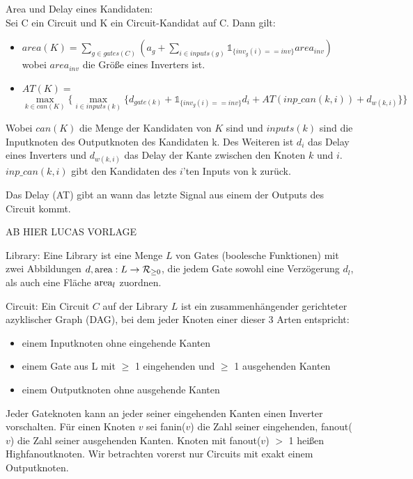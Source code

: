 \documentclass[11pt, a4paper, german]{article}
\begin{document}
\begin{definition}{Area und Delay eines Kandidaten:}\\
Sei C ein Circuit und K ein Circuit-Kandidat auf C. Dann gilt: \\
\begin{itemize}
\item $area(K) = \sum_{g \in gates(C)} (a_g + \sum_{i \in inputs(g)} \mathbb{1}_{\{inv_g(i)==inv\}} area_{inv})$ \\
wobei $area_{inv}$ die Größe eines Inverters ist.
\item $AT(K) = $\\$  \max\limits_{k \in can(K)} \{\max\limits_{i \in inputs(k)} \{   d_{gate(k)} + \mathbb{1}_{\{inv_g(i)==inv\}} d_{i} + AT(inp\_can(k,i)) + d_{w(k,i)} \} \}$ 
\end{itemize}
Wobei $can(K)$ die Menge der Kandidaten von $K$ sind und $inputs(k)$ sind die Inputknoten des Outputknoten des Kandidaten k. Des Weiteren ist $d_i$ das Delay eines Inverters und $d_{w(k,i)} $ das Delay der Kante zwischen den Knoten $k$ und $i$. $inp\_can(k,i)$ gibt den Kandidaten des $i$'ten Inputs von k zurück. 

\end{definition}

Das Delay (AT) gibt an wann das letzte Signal aus einem der Outputs des Circuit kommt.



AB HIER LUCAS VORLAGE

\begin{definition}{Library: }Eine Library ist eine Menge $L$ von Gates (boolesche Funktionen) mit zwei Abbildungen $d, \text{area}: L \to \mathcal{R}_{\geq 0}$, die jedem Gate sowohl eine Verzögerung $d_l$, als auch eine Fl\"ache $\text{area}_l$ zuordnen.
\end{definition}

\begin{figure}
 
\end{figure}


\begin{definition}{Circuit: }Ein Circuit $C$ auf der Library $L$ ist ein zusammenhängender gerichteter azyklischer Graph (DAG), bei dem jeder Knoten einer dieser 3 Arten entspricht:
 \begin{itemize}
  \item einem Inputknoten ohne eingehende Kanten
  \item einem Gate aus L mit $\geq$ 1 eingehenden und $\geq$ 1 ausgehenden Kanten
  \item einem Outputknoten ohne ausgehende Kanten
 \end{itemize}
 Jeder Gateknoten kann an jeder seiner eingehenden Kanten einen Inverter vorschalten.
 Für einen Knoten $v$ sei fanin($v$) die Zahl seiner eingehenden, fanout($v$) die Zahl seiner ausgehenden Kanten. Knoten mit fanout($v$) $>$ 1 heißen Highfanoutknoten. Wir betrachten vorerst nur Circuits mit exakt einem Outputknoten.
\end{definition}
\end{document}
